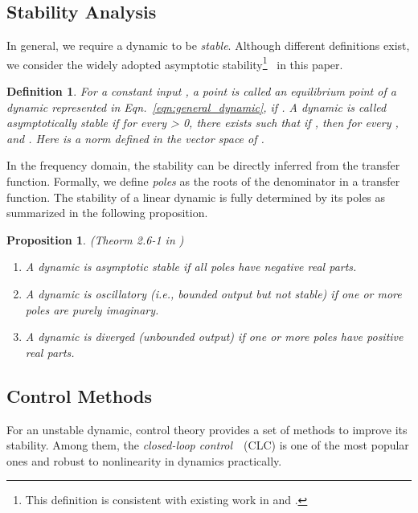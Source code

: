 \documentclass{article}
\newcommand{\eqn}[1]{Eqn.~\eqref{eqn:#1}}
\newtheorem{prop}{Proposition}
\newtheorem{definition}{Definition}
\theoremstyle{definition}
\begin{document}
\subsection{Stability Analysis}
\label{sec:stability_analysis}

In general, we require a dynamic to be {\it stable}. Although different definitions exist, we consider the widely adopted asymptotic stability\footnote{This definition is consistent with existing work in \citet{mescheder2017numerics} and \citet{mescheder2018training}.}~\cite{kailath1980linear} in this paper.
\begin{definition}
	For a constant input , a point  is called an equilibrium point of a dynamic represented in \eqn{general_dynamic}, if . A dynamic is called asymptotically stable if for every  > 0, there exists  such that if , then for every ,  and . Here  is a norm defined in the vector space of .
\end{definition}


In the frequency domain, the stability can be directly inferred from the transfer function. Formally, we define {\it poles} as the roots of the denominator in a transfer function. The stability of a linear dynamic is fully determined by its poles as summarized in the following proposition.\newpage

\begin{prop}(Theorm 2.6-1 in \citet{kailath1980linear})
\vspace{-.15cm}
\begin{enumerate}
	\setlength\itemsep{-2pt}
	\item A dynamic is asymptotic stable if all poles have negative real parts.
	\item A dynamic is oscillatory (i.e., bounded output but not stable) if one or more poles are purely imaginary.
	\item A dynamic is diverged (unbounded output) if one or more poles have positive real parts.
\end{enumerate}
\label{prop_stability}
\end{prop}



\subsection{Control Methods}
\label{sec:control_method}


For an unstable dynamic, control theory provides a set of methods to improve its stability. Among them, 
the {\it closed-loop control}~\cite{kailath1980linear}~(CLC) is one of the most popular ones and robust to nonlinearity in dynamics practically. 
\end{document}
